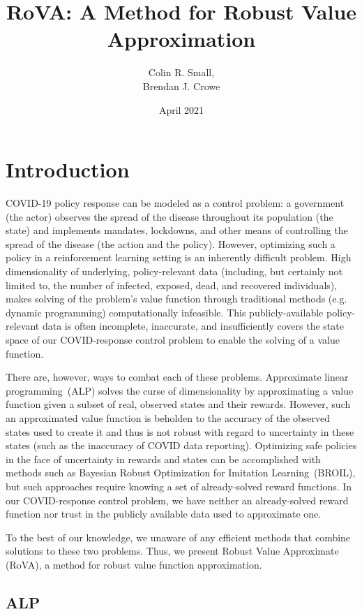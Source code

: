 \documentclass{article}
\title{RoVA: A Method for Robust Value Approximation}
\author{Colin R. Small, \\ Brendan J. Crowe}
\date{April 2021}
\begin{document}
\maketitle

\section{Introduction}
COVID-19 policy response can be modeled as a control problem: a government (the actor) observes the spread of the disease throughout its population (the state) and implements mandates, lockdowns, and other means of controlling the spread of the disease (the action and the policy). However, optimizing such a policy in a reinforcement learning setting is an inherently difficult problem. High dimensionality of underlying, policy-relevant data (including, but certainly not limited to, the number of infected, exposed, dead, and recovered individuals), makes solving of the problem's value function through traditional methods (e.g. dynamic programming) computationally infeasible. This publicly-available policy-relevant data is often incomplete, inaccurate, and insufficiently covers the state space of our COVID-response control problem to enable the solving of a value function. 

There are, however, ways to combat each of these problems. Approximate linear programming~(ALP) solves the curse of dimensionality by approximating a value function given a subset of real, observed states and their rewards. However, such an approximated value function is beholden to the accuracy of the observed states used to create it and thus is not robust with regard to uncertainty in these states (such as the inaccuracy of COVID data reporting). Optimizing safe policies in the face of uncertainty in rewards and states can be accomplished with methods such as Bayesian Robust Optimization for Imitation Learning~(BROIL)\cite{brown2020bayesian}, but such approaches require knowing a set of already-solved reward functions. In our COVID-response control problem, we have neither an already-solved reward function nor trust in the publicly available data used to approximate one.

To the best of our knowledge, we unaware of any efficient methods that combine solutions to these two problems. Thus, we present Robust Value Approximate (RoVA), a method for robust value function approximation. 

\subsection{ALP}
\end{document}
